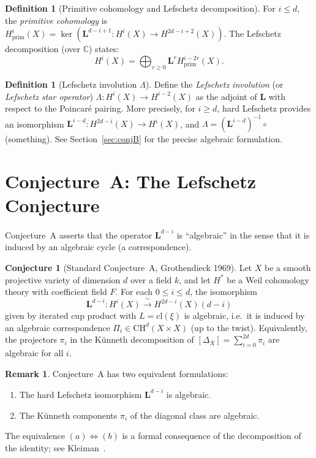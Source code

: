 \documentclass[12pt,a4paper]{amsart}
\theoremstyle{definition}
\newtheorem{definition}[theorem]{Definition}
\newtheorem{remark}[theorem]{Remark}
\newtheorem{conjecture}[theorem]{Conjecture}
\newcommand{\C}{\mathbb{C}}
\newcommand{\CH}{\mathrm{CH}}
\newcommand{\cl}{\mathrm{cl}}
\begin{document}
\begin{definition}[Primitive cohomology and Lefschetz decomposition]
For $i \leq d$, the \emph{primitive cohomology} is
$H^i_{\mathrm{prim}}(X) = \ker(\mathbf{L}^{d-i+1}: H^i(X) \to H^{2d-i+2}(X))$.
The Lefschetz decomposition (over $\C$) states:
\[
  H^i(X) = \bigoplus_{r \geq 0} \mathbf{L}^r H^{i-2r}_{\mathrm{prim}}(X).
\]
\end{definition}

\begin{definition}[Lefschetz involution $\Lambda$]
Define the \emph{Lefschetz involution} (or \emph{Lefschetz star operator})
$\Lambda: H^i(X) \to H^{i-2}(X)$ as the adjoint of $\mathbf{L}$ with
respect to the Poincar\'e pairing.  More precisely, for $i \geq d$,
hard Lefschetz provides an isomorphism $\mathbf{L}^{i-d}: H^{2d-i}(X) \to
H^i(X)$, and $\Lambda = (\mathbf{L}^{i-d})^{-1} \circ$ (something).
See Section~\ref{sec:conjB} for the precise algebraic formulation.
\end{definition}

\section{Conjecture~A: The Lefschetz Conjecture}\label{sec:conjA}

Conjecture~A asserts that the operator $\mathbf{L}^{d-i}$ is ``algebraic''
in the sense that it is induced by an algebraic cycle (a correspondence).

\begin{conjecture}[Standard Conjecture~A, Grothendieck 1969]\label{conj:A}
Let $X$ be a smooth projective variety of dimension $d$ over a field $k$,
and let $H^*$ be a Weil cohomology theory with coefficient field $F$.
For each $0 \leq i \leq d$, the isomorphism
\[
  \mathbf{L}^{d-i} : H^i(X) \xrightarrow{\;\sim\;} H^{2d-i}(X)(d-i)
\]
given by iterated cup product with $L = \cl(\xi)$ is algebraic, i.e.\ it is
induced by an algebraic correspondence $\Pi_i \in \CH^d(X \times X)$ (up to
the twist).  Equivalently, the projectors $\pi_i$ in the K\"unneth decomposition
of $[\Delta_X] = \sum_{i=0}^{2d} \pi_i$ are algebraic for all $i$.
\end{conjecture}

\begin{remark}
Conjecture~A has two equivalent formulations:
\begin{enumerate}[label=(\alph*)]
  \item The hard Lefschetz isomorphism $\mathbf{L}^{d-i}$ is algebraic.
  \item The K\"unneth components $\pi_i$ of the diagonal class are algebraic.
\end{enumerate}
The equivalence $(a) \Leftrightarrow (b)$ is a formal consequence of the
decomposition of the identity; see Kleiman~\cite{kleiman1968}.
\end{remark}
\end{document}
